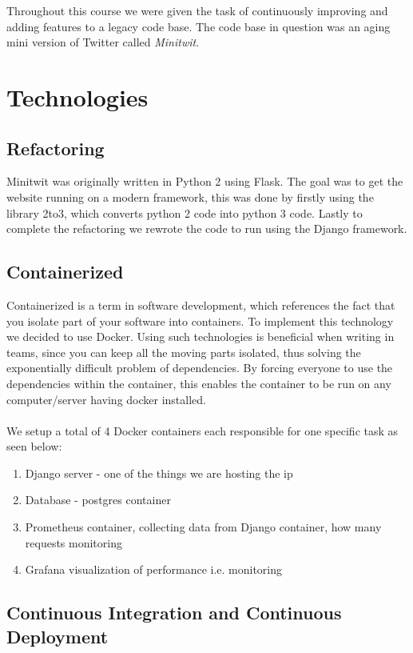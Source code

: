 Throughout this course we were given the task of continuously improving and adding features to a legacy code base. The code base in question was an aging mini version of Twitter called \textit{Minitwit}. 

\section*{Technologies}

\subsection*{Refactoring}

Minitwit was originally written in Python 2 using Flask. The goal was to get the website running on a modern framework, this was done by firstly using the library 2to3, which converts python 2 code into python 3 code. Lastly to complete the refactoring we rewrote the code to run using the Django framework.

\subsection*{Containerized}

Containerized is a term in software development, which references the fact that you isolate part of your software into containers. To implement this technology we decided to use Docker. Using such technologies is beneficial when writing in teams, since you can keep all the moving parts isolated, thus solving the exponentially difficult problem of dependencies. By forcing everyone to use the dependencies within the container, this enables the container to be run on any computer/server having docker installed.
\\\\
We setup a total of 4 Docker containers each responsible for one specific task as seen below:


\begin{enumerate}
    \item Django server - one of the things we are hosting the ip
    \item Database - postgres container 
    \item Prometheus container, collecting data from Django container, how many requests monitoring
    \item Grafana visualization of performance i.e. monitoring
\end{enumerate}

\subsection*{Continuous Integration and Continuous Deployment}

